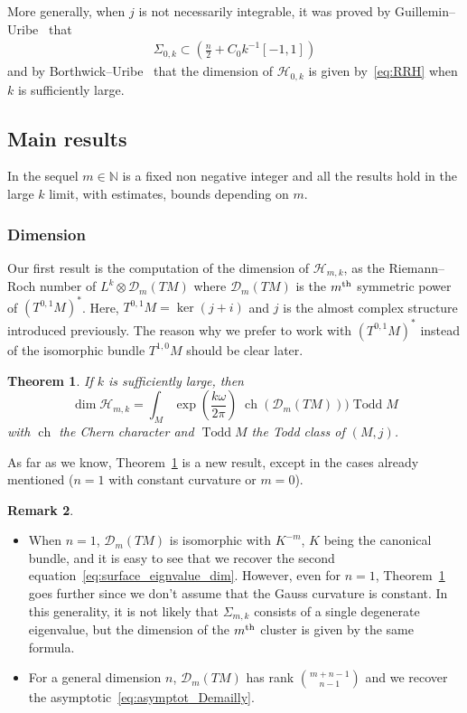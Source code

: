 \documentclass[10pt,a4paper]{article}
\newtheorem{theo}{Theorem}[section]
\theoremstyle{definition}
\newtheorem{rema}[theo]{Remark}
\numberwithin{equation}{section}
\newcommand{\N}{{\mathbb{N}}}
\newcommand{\om}{{\omega}}
\newcommand{\Si}{{\Sigma}}
\newcommand{\op}{\operatorname}
\newcommand{\D}{\mathcal{D}}
\newcommand{\Hilb}{\mathcal{H}}
\begin{document}
More generally, when $j$ is not necessarily integrable, it was proved by Guillemin--Uribe~\cite{GuUr88} that
\begin{gather}\label{eq:si_0-k_Guillemin_Uribe}
\Si_{0,k} \subset \left(\tfrac{n}{2} + C_0 k^{-1} [-1,1] \right)
\end{gather}
and by Borthwick--Uribe~\cite{BoUr96} that the dimension of $\Hilb_{0,k}$ is given by~\eqref{eq:RRH} when $k$ is sufficiently large.

\subsection{Main results}

In the sequel $m \in \N$ is a fixed non negative integer and all the results hold in the large $k$ limit, with estimates, bounds depending on $m$.

\subsubsection{Dimension}
Our first result is the computation of the dimension of $\Hilb_{m,k}$, as the Riemann--Roch number of $L^k \otimes \D_m (TM)$ where $\D_m (TM)$ is the $m^{\rm th}$ symmetric power of $(T^{0,1} M)^*$. Here, $T^{0,1}M = \ker (j + i)$ and $j$ is the almost complex structure introduced previously. The reason why we prefer to work with $(T^{0,1}M)^*$ instead of the isomorphic bundle $T^{1,0}M$ should be clear later.

\begin{theo}\label{theo:dim_landau}
If $k$ is sufficiently large, then
\[
\op{dim} \Hilb_{m,k} = \int_M \exp \left(\frac{k\om}{2\pi} \right) \; \op{ch} (\D_m (TM))) \op{Todd} M
\]
with $\op{ch}$ the Chern character and $\op{Todd} M$ the Todd class of $(M,j)$.
\end{theo}

As far as we know, Theorem~\ref{theo:dim_landau} is a new result, except in the cases already mentioned ($n=1$ with constant curvature or $m=0$).

\begin{rema}\leavevmode
\begin{itemize}
\item[-] When $n=1$, $\D_m (TM)$ is isomorphic with $K^{-m}$, $K$ being the canonical bundle, and it is easy to see that we recover the second equation~\eqref{eq:surface_eignvalue_dim}. However, even for $n=1$, Theorem~\ref{theo:dim_landau} goes further since we don't assume that the Gauss curvature is constant. In this generality, it is not likely that $\Si_{m,k}$ consists of a single degenerate eigenvalue, but the dimension of the $m^{\rm th}$ cluster is given by the same formula.
\item[-] For a general dimension $n$, $\D_m (TM)$ has rank $\binom{ {m+n-1}}{{n-1} }$ and we recover the asymptotic~\eqref{eq:asymptot_Demailly}.
\end{itemize}
\end{rema}
\end{document}
